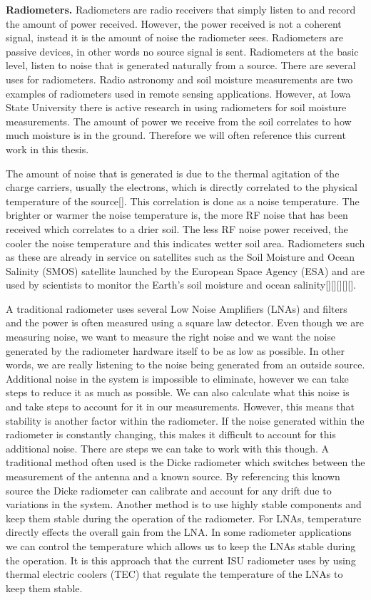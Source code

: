 \textbf{Radiometers.}  Radiometers are radio receivers that simply listen to and record the amount of power received.  However, the power received is not a coherent signal, instead it is the amount of noise the radiometer sees.  Radiometers are passive devices, in other words no source signal is sent.  Radiometers at the basic level, listen to noise that is generated naturally from a source.  There are several uses for radiometers.  Radio astronomy and soil moisture measurements are two examples of radiometers used in remote sensing applications.  However, at Iowa State University there is active research in using radiometers for soil moisture measurements.  The amount of power we receive from the soil correlates to how much moisture is in the ground.  Therefore we will often reference this current work in this thesis.   

The amount of noise that is generated is due to the thermal agitation of the charge carriers, usually the electrons, which is directly correlated to the physical temperature of the source[\cite{Nyquist1928thermal}].  This correlation is done as a noise temperature.  The brighter or warmer the noise temperature is, the more RF noise that has been received which correlates to a drier soil.  The less RF noise power received, the cooler the noise temperature and this indicates wetter soil area. Radiometers such as these are already in service on satellites such as the Soil Moisture and Ocean Salinity (SMOS) satellite launched by the European Space Agency (ESA) and are used by scientists to monitor the Earth's soil moisture and ocean salinity[\cite{Liu}][\cite{McMullan}][\cite{Ruf}][\cite{McIntyre}][\cite{Hardy}].  

A traditional radiometer uses several Low Noise Amplifiers (LNAs) and filters and the power is often measured using a square law detector.  Even though we are measuring noise, we want to measure the right noise and we want the noise generated by the radiometer hardware itself to be as low as possible.  In other words, we are really listening to the noise being generated from an outside source.  Additional noise in the system is impossible to eliminate, however we can take steps to reduce it as much as possible.  We can also calculate what this noise is and take steps to account for it in our measurements.  However, this means that stability is another factor within the radiometer.  If the noise generated within the radiometer is constantly changing, this makes it difficult to account for this additional noise.  There are steps we can take to work with this though.  A traditional method often used is the Dicke radiometer which switches between the measurement of the antenna and a known source\cite{Dicke}.  By referencing this known source the Dicke radiometer can calibrate and account for any drift due to variations in the system.  Another method is to use highly stable components and keep them stable during the operation of the radiometer.  For LNAs, temperature directly effects the overall gain from the LNA.  In some radiometer applications we can control the temperature which allows us to keep the LNAs stable during the operation.  It is this approach that the current ISU radiometer uses by using thermal electric coolers (TEC) that  regulate the temperature of the LNAs to keep them stable.

